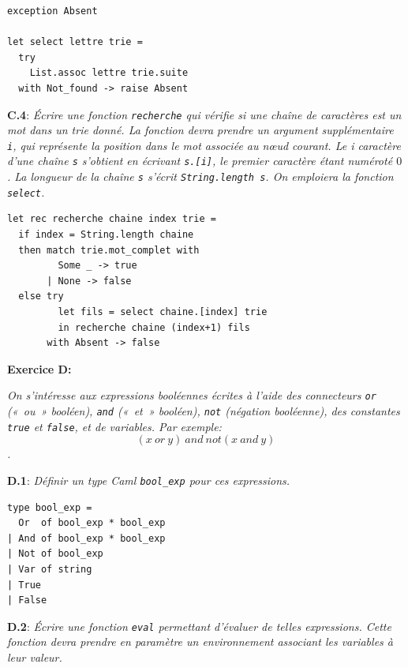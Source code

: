 \documentclass[11pt, a4paper]{article}
\begin{document}
\smallskip

\begin{verbatim}
exception Absent

let select lettre trie =
  try
    List.assoc lettre trie.suite
  with Not_found -> raise Absent
\end{verbatim}

\smallskip

\noindent
\textbf{C.4}: \emph{Écrire une fonction \texttt{recherche} qui
vérifie si une chaîne de caractères est un mot dans un {\em
trie} donné. La fonction devra prendre un argument supplémentaire
{\tt i}, qui représente la position dans le mot associée au nœud
courant.  Le i\ieme{} caractère d'une chaîne {\tt s} s'obtient en
écrivant {\tt s.[i]}, le premier caractère étant numéroté $0$. La
longueur de la chaîne {\tt s} s'écrit {\tt String.length s}. On
emploiera la fonction \texttt{select}.}

\smallskip

\begin{verbatim}
let rec recherche chaine index trie =
  if index = String.length chaine
  then match trie.mot_complet with
         Some _ -> true
       | None -> false
  else try
         let fils = select chaine.[index] trie
         in recherche chaine (index+1) fils
       with Absent -> false
\end{verbatim}

\smallskip

\noindent
\textbf{Exercice D:}

\noindent
\emph{On s'intéresse aux expressions booléennes écrites à
l'aide des connecteurs \texttt{or} («~ou~» booléen), \texttt{and}
(«~et~» booléen), \texttt{not} (négation booléenne), des
constantes \texttt{true} et \texttt{false}, et de variables.  Par
exemple: $$(x ~or~ y) ~and~ not(x ~and~ y)$$.}

\smallskip

\noindent
\textbf{D.1}: \emph{Définir un type Caml \texttt{bool\_exp} pour ces
expressions.}

\smallskip

\begin{verbatim}
type bool_exp =
  Or  of bool_exp * bool_exp
| And of bool_exp * bool_exp
| Not of bool_exp
| Var of string
| True
| False
\end{verbatim}

\smallskip

\noindent
\textbf{D.2}: \emph{Écrire une fonction \texttt{eval} permettant
d'évaluer de telles expressions. Cette fonction devra prendre en
paramètre un environnement associant les variables à leur valeur.}
\end{document}
